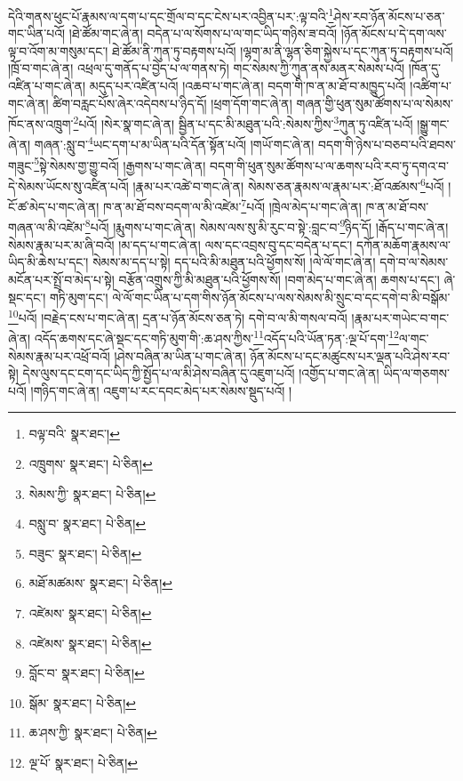 དེའི་གནས་ཕུང་པོ་རྣམས་ལ་དག་པ་དང་གྲོལ་བ་དང་ངེས་པར་འབྱིན་པར་:ལྟ་བའི་\footnote{བལྟ་བའི་  སྣར་ཐང་། }ཤེས་རབ་ཉོན་མོངས་པ་ཅན་གང་ཡིན་པའོ། །ཐེ་ཚོམ་གང་ཞེ་ན། བདེན་པ་ལ་སོགས་པ་ལ་གང་ཡིད་གཉིས་ཟ་བའོ། །ཉོན་མོངས་པ་དེ་དག་ལས་ལྟ་བ་འོག་མ་གསུམ་དང་། ཐེ་ཚོམ་ནི་ཀུན་ཏུ་བརྟགས་པའོ། །ལྷག་མ་ནི་ལྷན་ཅིག་སྐྱེས་པ་དང་ཀུན་ཏུ་བརྟགས་པའོ། །ཁྲོ་བ་གང་ཞེ་ན། འཕྲལ་དུ་གནོད་པ་བྱེད་པ་ལ་གནས་ཏེ། གང་སེམས་ཀྱི་ཀུན་ནས་མནར་སེམས་པའོ། །ཁོན་དུ་འཛིན་པ་གང་ཞེ་ན། མདུད་པར་འཛིན་པའོ། །འཆབ་པ་གང་ཞེ་ན། བདག་གི་ཁ་ན་མ་ཐོ་བ་མཁྱུད་པའོ། །འཚིག་པ་གང་ཞེ་ན། ཚིག་བརླང་པོས་ཞེར་འདེབས་པ་ཉིད་དོ། །ཕྲག་དོག་གང་ཞེ་ན། གཞན་གྱི་ཕུན་སུམ་ཚོགས་པ་ལ་སེམས་ཁོང་ནས་འཁྲུག་\footnote{འཁྲུགས་  སྣར་ཐང་།  པེ་ཅིན། }པའོ། །སེར་སྣ་གང་ཞེ་ན། སྦྱིན་པ་དང་མི་མཐུན་པའི་:སེམས་ཀྱིས་\footnote{སེམས་ཀྱི་  སྣར་ཐང་།  པེ་ཅིན། }ཀུན་ཏུ་འཛིན་པའོ། །སྒྱུ་གང་ཞེ་ན། གཞན་:སླུ་བ་\footnote{བསླུ་བ་  སྣར་ཐང་།  པེ་ཅིན། }ཡང་དག་པ་མ་ཡིན་པའི་དོན་སྟོན་པའོ། །གཡོ་གང་ཞེ་ན། བདག་གི་ཉེས་པ་བཅབ་པའི་ཐབས་གཟུང་\footnote{བཟུང་  སྣར་ཐང་།  པེ་ཅིན། }སྟེ་སེམས་གྱ་གྱུ་བའོ། །རྒྱགས་པ་གང་ཞེ་ན། བདག་གི་ཕུན་སུམ་ཚོགས་པ་ལ་ཆགས་པའི་རབ་ཏུ་དགའ་བ་དེ་སེམས་ཡོངས་སུ་འཛིན་པའོ། །རྣམ་པར་འཚེ་བ་གང་ཞེ་ན། སེམས་ཅན་རྣམས་ལ་རྣམ་པར་:ཐོ་འཚམས་\footnote{མཐོ་མཚམས་  སྣར་ཐང་།  པེ་ཅིན། }པའོ། །ངོ་ཚ་མེད་པ་གང་ཞེ་ན། ཁ་ན་མ་ཐོ་བས་བདག་ལ་མི་འཛེམ་\footnote{འཛེམས་  སྣར་ཐང་།  པེ་ཅིན། }པའོ། །ཁྲེལ་མེད་པ་གང་ཞེ་ན། ཁ་ན་མ་ཐོ་བས་གཞན་ལ་མི་འཛེམ་\footnote{འཛེམས་  སྣར་ཐང་།  པེ་ཅིན། }པའོ། །རྨུགས་པ་གང་ཞེ་ན། སེམས་ལས་སུ་མི་རུང་བ་སྟེ་:བླང་བ་\footnote{བློང་བ་  སྣར་ཐང་།  པེ་ཅིན། }ཉིད་དོ། །རྒོད་པ་གང་ཞེ་ན། སེམས་རྣམ་པར་མ་ཞི་བའོ། །མ་དད་པ་གང་ཞེ་ན། ལས་དང་འབྲས་བུ་དང་བདེན་པ་དང་། དཀོན་མཆོག་རྣམས་ལ་ཡིད་མི་ཆེས་པ་དང་། སེམས་མ་དད་པ་སྟེ། དད་པའི་མི་མཐུན་པའི་ཕྱོགས་སོ། །ལེ་ལོ་གང་ཞེ་ན། དགེ་བ་ལ་སེམས་མངོན་པར་སྤྲོ་བ་མེད་པ་སྟེ། བརྩོན་འགྲུས་ཀྱི་མི་མཐུན་པའི་ཕྱོགས་སོ། །བག་མེད་པ་གང་ཞེ་ན། ཆགས་པ་དང་། ཞེ་སྡང་དང་། གཏི་མུག་དང་། ལེ་ལོ་གང་ཡིན་པ་དག་གིས་ཉོན་མོངས་པ་ལས་སེམས་མི་སྲུང་བ་དང་དགེ་བ་མི་བསྒོམ་\footnote{སྒོམ་  སྣར་ཐང་།  པེ་ཅིན། }པའོ། །བརྗེད་ངས་པ་གང་ཞེ་ན། དྲན་པ་ཉོན་མོངས་ཅན་ཏེ། དགེ་བ་ལ་མི་གསལ་བའོ། །རྣམ་པར་གཡེང་བ་གང་ཞེ་ན། འདོད་ཆགས་དང་ཞེ་སྡང་དང་གཏི་མུག་གི་:ཆ་ཤས་ཀྱིས་\footnote{ཆ་ཤས་ཀྱི་  སྣར་ཐང་།  པེ་ཅིན། }འདོད་པའི་ཡོན་ཏན་:ལྔ་པོ་དག་\footnote{ལྔ་པོ་  སྣར་ཐང་།  པེ་ཅིན། }ལ་གང་སེམས་རྣམ་པར་འཕྲོ་བའོ། །ཤེས་བཞིན་མ་ཡིན་པ་གང་ཞེ་ན། ཉོན་མོངས་པ་དང་མཚུངས་པར་ལྡན་པའི་ཤེས་རབ་སྟེ། དེས་ལུས་དང་ངག་དང་ཡིད་ཀྱི་སྤྱོད་པ་ལ་མི་ཤེས་བཞིན་དུ་འཇུག་པའོ། །འགྱོད་པ་གང་ཞེ་ན། ཡིད་ལ་གཅགས་པའོ། །གཉིད་གང་ཞེ་ན། འཇུག་པ་རང་དབང་མེད་པར་སེམས་སྡུད་པའོ། །
